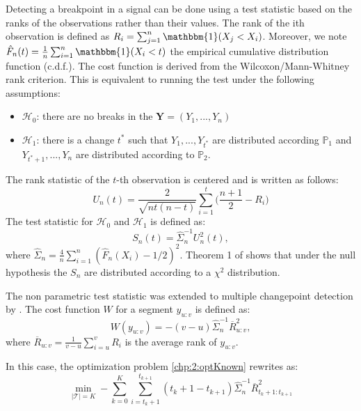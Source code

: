 Detecting a breakpoint in a signal can be done using a test statistic based on the ranks of the observations rather than their values. The rank of the ith observation is defined as $R_i = \sum_{j =1}^n\mathbbm{1}(X_j < X_i)$. Moreover, we note $\hat{F}_n(t) = \frac{1}{n}\sum_{i = 1}^n\mathbbm{1}(X_i < t)$ the empirical cumulative distribution function (c.d.f.). The cost function is derived from the Wilcoxon/Mann-Whitney rank criterion. This is equivalent to running the test under the following assumptions: 
\begin{itemize}
  \item $\mathcal{H}_0$: there are no breaks in the $\bm Y = (Y_1,...,Y_n)$ 
  \item $\mathcal{H}_1$: there is a change $t^*$ such that $Y_1,...,Y_{t^*}$ are distributed according $\mathbb{P}_1$ and $Y_{t^*+1},...,Y_{n}$ are distributed according to $\mathbb{P}_2$. 
\end{itemize}
The rank statistic of the $t$-th observation is centered and is written as follows:
\begin{equation}\label{chp2:statranknp}
  U_n(t) = \frac{2}{\sqrt{nt(n-t)}}\sum_{i = 1}^{t}\bigg(\frac{n+1}{2} - R_i\bigg)
\end{equation}
The test statistic for $\mathcal{H}_0$ and $\mathcal{H}_1$ is defined as:
\begin{equation}\label{chp2:stattestnp}
  S_n(t) = \hat{\Sigma}_n^{-1} U^2_n(t),
\end{equation}
where $\hat{\Sigma}_n = \frac{4}{n}\sum_{i=1}^n(\hat{F}_n(X_i)-1/2)^2$. Theorem 1 of \cite{lung2015} shows that under the null hypothesis the $S_n$ are distributed according to a $\chi^2$ distribution.

The non parametric test statistic was extended to multiple changepoint detection by \cite{lung2015}. The cost function $W$ for a segment $y_{u:v}$ is defined as: 
\begin{equation}
  W(y_{u:v}) = -(v-u)\hat{\Sigma}^{-1}_n\overline{R}^2_{u:v},
\end{equation}
where $\overline{R}_{u:v} = \frac{1}{v-u}\sum_{i = u}^vR_i$ is the average rank of $y_{u:v}$.

In this case, the optimization problem \ref{chp:2:optKnown} rewrites as: 
\begin{equation}\label{chp:2:npcost}
\min_{\lvert\mathcal{T}\rvert = K}  -\sum_{k=0}^K \sum_{i = t_k+1}^{t_{k+1}} (t_k+1-t_{k+1})\hat{\Sigma}^{-1}_n\overline{R}^2_{t_k+1:t_{k+1}}
\end{equation}       

